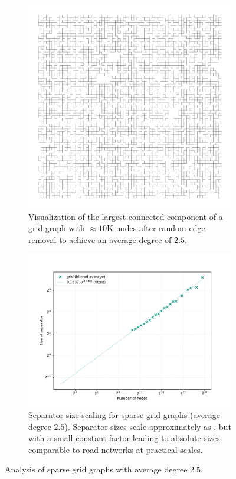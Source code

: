 \begin{figure}
	\centering
	\begin{subfigure}{0.35\linewidth}
		\centering
		\includegraphics[width=\linewidth]{graphics/grid_avg_deg.png}
		\caption{Visualization of the largest connected component of a grid graph with \(\approx 10\text{K}\) nodes after random edge removal to achieve an average degree of \(2.5\).}
		\label{fig:sparse_grid_viz}
	\end{subfigure}
	\hfill
	\begin{subfigure}{0.55\linewidth}
		\centering
		\includegraphics[width=\linewidth]{graphics/sep_grid_avg_deg.png}
		\caption{Separator size scaling for sparse grid graphs (average degree \(2.5\)). Separator sizes scale approximately as , but with a small constant factor leading to absolute sizes comparable to road networks at practical scales.}
		\label{fig:sparse_grid_sep_plot}
	\end{subfigure}
	\caption{Analysis of sparse grid graphs with average degree \(2.5\).}
	\label{fig:sparse_grid_separators}
\end{figure}

